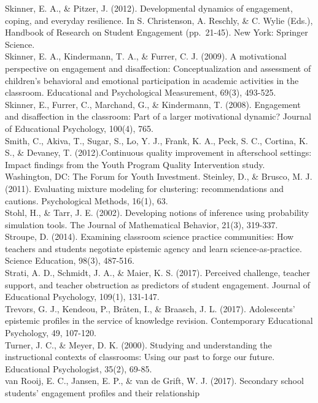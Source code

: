 \documentclass[]{msu-thesis}
\theoremstyle{definition}
\theoremstyle{definition}
\theoremstyle{definition}
\theoremstyle{remark}
\begin{document}
Skinner, E. A., \& Pitzer, J. (2012). Developmental dynamics of
engagement, coping, and everyday resilience. In S. Christenson, A.
Reschly, \& C. Wylie (Eds.), Handbook of Research on Student Engagement
(pp.~21-45). New York: Springer Science.\\
Skinner, E. A., Kindermann, T. A., \& Furrer, C. J. (2009). A
motivational perspective on engagement and disaffection:
Conceptualization and assessment of children's behavioral and emotional
participation in academic activities in the classroom. Educational and
Psychological Measurement, 69(3), 493-525.\\
Skinner, E., Furrer, C., Marchand, G., \& Kindermann, T. (2008).
Engagement and disaffection in the classroom: Part of a larger
motivational dynamic? Journal of Educational Psychology, 100(4), 765.\\
Smith, C., Akiva, T., Sugar, S., Lo, Y. J., Frank, K. A., Peck, S. C.,
Cortina, K. S., \& Devaney, T. (2012).Continuous quality improvement in
afterschool settings: Impact findings from the Youth Program Quality
Intervention study. Washington, DC: The Forum for Youth Investment.
Steinley, D., \& Brusco, M. J. (2011). Evaluating mixture modeling for
clustering: recommendations and cautions. Psychological Methods, 16(1),
63.\\
Stohl, H., \& Tarr, J. E. (2002). Developing notions of inference using
probability simulation tools. The Journal of Mathematical Behavior,
21(3), 319-337.\\
Stroupe, D. (2014). Examining classroom science practice communities:
How teachers and students negotiate epistemic agency and learn
science‐as‐practice. Science Education, 98(3), 487-516.\\
Strati, A. D., Schmidt, J. A., \& Maier, K. S. (2017). Perceived
challenge, teacher support, and teacher obstruction as predictors of
student engagement. Journal of Educational Psychology, 109(1),
131-147.\\
Trevors, G. J., Kendeou, P., Bråten, I., \& Braasch, J. L. (2017).
Adolescents' epistemic profiles in the service of knowledge revision.
Contemporary Educational Psychology, 49, 107-120.\\
Turner, J. C., \& Meyer, D. K. (2000). Studying and understanding the
instructional contexts of classrooms: Using our past to forge our
future. Educational Psychologist, 35(2), 69-85.\\
van Rooij, E. C., Jansen, E. P., \& van de Grift, W. J. (2017).
Secondary school students' engagement profiles and their relationship
\end{document}
